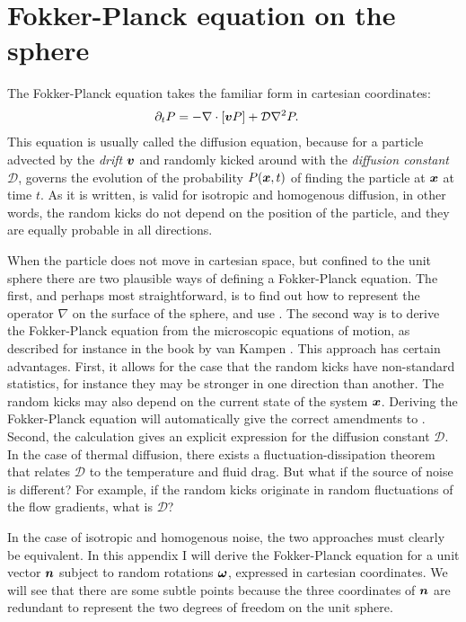 \documentclass[thesis.tex]{subfiles}
\begin{document}
\chapter{Fokker-Planck equation on the sphere}

The Fokker-Planck equation takes the familiar form in cartesian coordinates:
\begin{align}
	\partial_t P &= -\nabla \cdot [\ve v P] + \mathcal D \nabla^2 P.\eqnlab{diffusion}
\end{align}
This equation is usually called the diffusion equation, because for a particle advected by the \emph{drift} $\mbox{\boldmath$v$}$ and randomly kicked around with the \emph{diffusion constant} $\mathcal D$,  governs the evolution of the probability $P(\mbox{\boldmath$x$},t)$ of finding the particle at $\mbox{\boldmath$x$}$ at time $t$. As it is written,  is valid for isotropic and homogenous diffusion, in other words, the random kicks do not depend on the position of the particle, and they are equally probable in all directions. 

When the particle does not move in cartesian space, but confined to the unit sphere there are two plausible ways of defining a Fokker-Planck equation. The first, and perhaps most straightforward, is to find out how to represent the operator $\nabla$ on the surface of the sphere, and use . The second way is to derive the Fokker-Planck equation from the microscopic equations of motion, as described for instance in the book by van Kampen \cite{kampen07}. This approach has certain advantages. First, it allows for the case that the random kicks have non-standard statistics, for instance they may be stronger in one direction than another. The random kicks may also depend on the current state of the system $\mbox{\boldmath$x$}$. Deriving the Fokker-Planck equation will automatically give the correct amendments to . Second, the calculation gives an explicit expression for the diffusion constant $\mathcal D$. In the case of thermal diffusion, there exists a fluctuation-dissipation theorem that relates $\mathcal D$ to the temperature and fluid drag. But what if the source of noise is different? For example, if the random kicks originate in random fluctuations of the flow gradients, what is $\mathcal D$?

In the case of isotropic and homogenous noise, the two approaches must clearly be equivalent. In this appendix I will derive the Fokker-Planck equation for a unit vector $\mbox{\boldmath$n$}$ subject to random rotations $\mbox{\boldmath$\omega$}$, expressed in cartesian coordinates. We will see that there are some subtle points because the three coordinates of $\mbox{\boldmath$n$}$ are redundant to represent the two degrees of freedom on the unit sphere.
\end{document}
